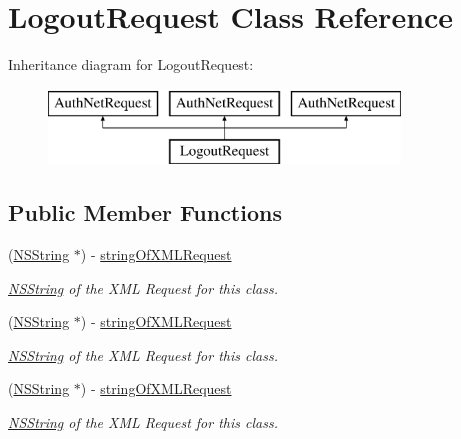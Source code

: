 \hypertarget{interface_logout_request}{
\section{LogoutRequest Class Reference}
\label{interface_logout_request}
}
Inheritance diagram for LogoutRequest:\begin{figure}[H]
\begin{center}
\leavevmode
\includegraphics[height=2.000000cm]{interface_logout_request}
\end{center}
\end{figure}
\subsection*{Public Member Functions}
\begin{DoxyCompactItemize}
\item 
(\hyperlink{class_n_s_string}{NSString} $\ast$) -\/ \hyperlink{interface_logout_request_acd75476bb33e0423b93890944b3cd728}{stringOfXMLRequest}
\begin{DoxyCompactList}\small\item\em \hyperlink{class_n_s_string}{NSString} of the XML Request for this class. \item\end{DoxyCompactList}\item 
(\hyperlink{class_n_s_string}{NSString} $\ast$) -\/ \hyperlink{interface_logout_request_acd75476bb33e0423b93890944b3cd728}{stringOfXMLRequest}
\begin{DoxyCompactList}\small\item\em \hyperlink{class_n_s_string}{NSString} of the XML Request for this class. \item\end{DoxyCompactList}\item 
(\hyperlink{class_n_s_string}{NSString} $\ast$) -\/ \hyperlink{interface_logout_request_acd75476bb33e0423b93890944b3cd728}{stringOfXMLRequest}
\begin{DoxyCompactList}\small\item\em \hyperlink{class_n_s_string}{NSString} of the XML Request for this class. \item\end{DoxyCompactList}\end{DoxyCompactItemize}
